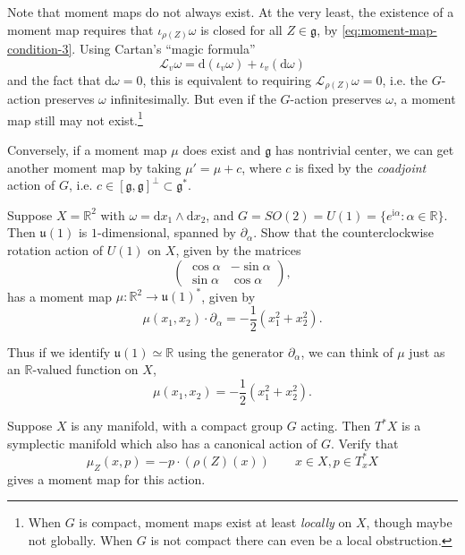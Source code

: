 \documentclass[12pt,letterpaper,reqno]{article}
\numberwithin{equation}{section}
\newcommand{\fg}{{\mathfrak g}}
\newcommand{\fu}{{\mathfrak u}}
\newcommand{\cL}{\ensuremath{\mathcal L}}
\newcommand{\R}{\ensuremath{\mathbb R}}
\newcommand{\half}{\ensuremath{\frac{1}{2}}}
\newcommand{\I}{{\mathrm i}}
\newcommand{\de}{\mathrm{d}}
\newcommand{\ti}[1]{\textit{#1}}
\begin{document}
Note that moment maps do not always exist.
At the very least, the existence of a moment
map requires that $\iota_{\rho(Z)} \omega$ is closed
for all $Z \in \fg$, by \eqref{eq:moment-map-condition-3}. Using
Cartan's ``magic formula''
\begin{equation} \label{eq:cartan-magic-formula}
  \cL_v \omega = \de (\iota_v \omega) + \iota_v (\de \omega)
\end{equation}
and the fact that $\de \omega = 0$,
this is equivalent to requiring $\cL_{\rho(Z)}\omega = 0$,
i.e. the $G$-action preserves $\omega$ infinitesimally.
But even if the $G$-action preserves $\omega$,
a moment map still may not exist.\footnote{When $G$ is compact,
moment maps exist at least
\ti{locally} on $X$, though maybe not globally. When $G$ is not
compact there can even be a local obstruction.}

Conversely, if a moment map $\mu$ does exist and $\fg$
has nontrivial center, we can get another moment map by taking
$\mu' = \mu + c$, where $c$ is fixed by the \ti{coadjoint}
action of $G$, i.e. $c \in [\fg,\fg]^\perp \subset \fg^*$.

\begin{exercise}
Suppose $X = \R^2$ with $\omega = \de x_1 \wedge \de x_2$, and
$G = SO(2) = U(1) = \{e^{\I \alpha}: \alpha \in \R \}$.
Then $\fu(1)$ is $1$-dimensional, spanned by $\partial_\alpha$.
Show that the counterclockwise rotation action of $U(1)$ on $X$,
given by the matrices
\begin{equation}
   \begin{pmatrix} \cos \alpha & - \sin \alpha \\ \sin \alpha & \cos \alpha \end{pmatrix},
 \end{equation}
has a moment map $\mu: \R^2 \to \fu(1)^*$, given by
\begin{equation}
  \mu(x_1,x_2) \cdot \partial_\alpha = -\half (x_1^2 + x_2^2).
\end{equation}
\end{exercise}
Thus if we identify $\fu(1) \simeq \R$ using the generator
$\partial_\alpha$, we can think of $\mu$ just as an $\R$-valued function
on $X$,
\begin{equation}
  \mu(x_1,x_2) = -\half (x_1^2 + x_2^2).
\end{equation}

\begin{exercise} \label{exc:cotangent-moment-map}
Suppose $X$ is any manifold, with a compact
group $G$ acting. Then $T^* X$ is a symplectic manifold
which also has a canonical action of $G$. Verify that
\begin{equation}
  \mu_Z(x,p) = -p \cdot (\rho(Z)(x)) \qquad x \in X, p \in T^*_x X
\end{equation}
gives a moment map for this action.
\end{exercise}
\end{document}
